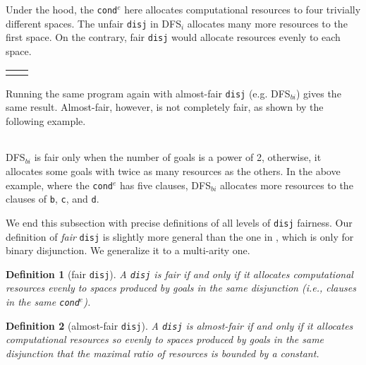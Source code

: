 \documentclass[format=acmlarge, review=false, authordraft=false]{acmart}
\newcommand{\conde}{\texttt{cond$^e$}}
\newcommand{\disj}{\texttt{disj}}
\newcommand{\DFSi }[0]{DFS$_{i}$}
\newcommand{\DFSbi}[0]{DFS$_{bi}$}
\newtheorem{defn}{Definition}[section]
\begin{document}
\begin{center}
	\begin{tabular}{c}
		
	\end{tabular}
\end{center}

Under the hood, the \conde{} here allocates computational resources to 
four trivially different spaces. The unfair \disj{} in 
\DFSi{} allocates many more resources to the first space. On the 
contrary, fair \disj{} would allocate resources evenly to each space. 

\begin{center}
	\begin{tabular}{l|r}
		 &
		
	\end{tabular}
\end{center}

Running the same program again with almost-fair \disj {} (e.g. 
\DFSbi{}) gives the same result. Almost-fair, however, is not 
completely fair, as shown by the following example. 

\begin{center}
	\begin{tabular}{c}
		
	\end{tabular}
\end{center}

\DFSbi{} is fair only when the number of goals is a power of 2, 
otherwise, it allocates some goals with twice as many resources as the 
others. In the above example, where the \conde{} has five clauses, \DFSbi{} 
allocates more resources to the clauses of \texttt{b}, \texttt{c}, and 
\texttt{d}.

We end this subsection with precise definitions of all levels of 
\disj{} fairness. Our definition of \emph{fair} \disj{} is slightly 
more general
than the one in \citet{seres1999algebra}, which is only
for binary disjunction. We generalize it to a multi-arity one.

\begin{defn}[fair \disj{}]
A \disj{} is fair if and only if it allocates computational resources evenly to 
spaces produced by goals in the same disjunction 
(i.e., clauses in the same \conde).
\end{defn}

\begin{defn}[almost-fair \disj{}]
A \disj{} is almost-fair if and only if it allocates computational resources
so evenly to spaces produced by goals in the same disjunction that 
the maximal ratio of resources is bounded by a constant.
\end{defn}
\end{document}
